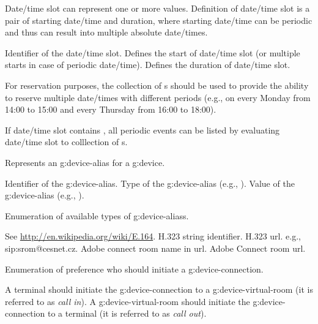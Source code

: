 \begin{Api}
Date/time slot can represent one or more  values. Definition of date/time slot is a pair of starting date/time and duration, where starting date/time can be periodic and thus can result into multiple absolute date/times.
\begin{ApiClassAttributes}
 Identifier of the date/time slot.
Defines the start of date/time slot (or multiple starts in case of periodic date/time).
Defines the duration of date/time slot.
\end{ApiClassAttributes}

For reservation purposes, the collection of s should be used to provide the ability to reserve multiple date/times with different periods (e.g., on every Monday from 14:00 to 15:00 and every Thursday from 16:00 to 18:00).

If date/time slot contains , all periodic events can be listed by evaluating date/time slot to colllection of s.

Represents an \gls{g:device-alias} for a \gls{g:device}.
\begin{ApiClassAttributes}
 Identifier of the \gls{g:device-alias}.
 Type of the \gls{g:device-alias} (e.g., ).
 Value of the \gls{g:device-alias} (e.g., ).
\end{ApiClassAttributes}

Enumeration of available types of \glspl{g:device-alias}.
\begin{ApiEnumValues}
 See \url{http://en.wikipedia.org/wiki/E.164}.
 H.323 string identifier.
 H.323 url.
 e.g., sip:srom@cesnet.cz.
 Adobe connect room name in url.
 Adobe Connect room url.
\end{ApiEnumValues}

Enumeration of preference who should initiate a \gls{g:device-connection}.
\begin{ApiEnumValues}
 A terminal should initiate the \gls{g:device-connection} to a \gls{g:device-virtual-room} (it is referred to as \emph{call in}).
 A \gls{g:device-virtual-room} should initiate the \gls{g:device-connection} to a terminal (it is referred to as \emph{call out}).
\end{ApiEnumValues}


\end{Api}
